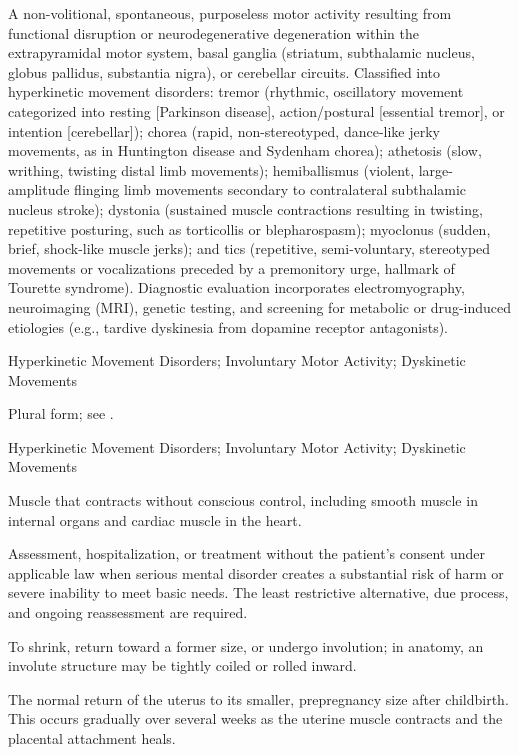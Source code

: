  A non-volitional, spontaneous, purposeless motor activity resulting from functional disruption or neurodegenerative degeneration within the extrapyramidal motor system, basal ganglia (striatum, subthalamic nucleus, globus pallidus, substantia nigra), or cerebellar circuits. Classified into hyperkinetic movement disorders: tremor (rhythmic, oscillatory movement categorized into resting [Parkinson disease], action/postural [essential tremor], or intention [cerebellar]); chorea (rapid, non-stereotyped, dance-like jerky movements, as in Huntington disease and Sydenham chorea); athetosis (slow, writhing, twisting distal limb movements); hemiballismus (violent, large-amplitude flinging limb movements secondary to contralateral subthalamic nucleus stroke); dystonia (sustained muscle contractions resulting in twisting, repetitive posturing, such as torticollis or blepharospasm); myoclonus (sudden, brief, shock-like muscle jerks); and tics (repetitive, semi-voluntary, stereotyped movements or vocalizations preceded by a premonitory urge, hallmark of Tourette syndrome). Diagnostic evaluation incorporates electromyography, neuroimaging (MRI), genetic testing, and screening for metabolic or drug-induced etiologies (e.g., tardive dyskinesia from dopamine receptor antagonists).

\synonyms
Hyperkinetic Movement Disorders; Involuntary Motor Activity; Dyskinetic Movements

 Plural form; see .

\synonyms
Hyperkinetic Movement Disorders; Involuntary Motor Activity; Dyskinetic Movements

 Muscle that contracts without conscious control, including smooth muscle in internal organs and cardiac muscle in the heart.

 Assessment, hospitalization, or treatment without the patient’s consent under applicable
law when serious mental disorder creates a substantial risk of harm or severe inability
to meet basic needs. The least restrictive alternative, due process, and ongoing
reassessment are required.

 To shrink, return toward a former size, or undergo involution; in anatomy, an involute structure may be tightly coiled or rolled inward.

 The normal return of the uterus to its smaller, prepregnancy size after childbirth. This occurs gradually over several weeks as the uterine muscle contracts and the placental attachment heals.


